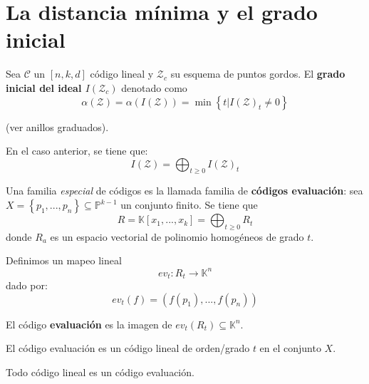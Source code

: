\documentclass[12pt]{report}
\newcounter{it}
\theoremstyle{largebreak}
\newcommand\cf[3]{\ensuremath{#1:#2\rightarrow#3}}
\begin{document}
    \section{La distancia mínima y el grado inicial}

    \begin{mydef}
        Sea $\mathcal{C}$ un $[n,k,d]$ código lineal y $\mathcal{Z}_c$ su esquema de puntos gordos. El \textbf{grado inicial del ideal $I(\mathcal{Z}_c)$} denotado como
        \begin{equation*}
            \alpha(\mathcal{Z})=\alpha(I(\mathcal{Z}))=\min\left\{t\Big|I(\mathcal{Z})_t\neq0 \right\}
        \end{equation*}
    \end{mydef}
    (ver anillos graduados).

    En el caso anterior, se tiene que:
    \begin{equation*}
        I(\mathcal{Z})=\bigoplus_{ t\geq0}I(\mathcal{Z})_t
    \end{equation*}

    Una familia \textit{especial} de códigos es la llamada familia de \textbf{códigos evaluación}: sea $X=\left\{p_1,...,p_n \right\}\subseteq\mathbb{P}^{ k-1}$ un conjunto finito. Se tiene que
    \begin{equation*}
        R=\mathbb{K}[x_1,...,x_k]=\bigoplus_{ t\geq0}R_t
    \end{equation*}
    donde $R_a$ es un espacio vectorial de polinomio homogéneos de grado $t$.

    Definimos un mapeo lineal
    \begin{equation*}
        \cf{ev_t}{R_t}{\mathbb{K}^n}
    \end{equation*}
    dado por:
    \begin{equation*}
        ev_t(f)=(f(p_1),...,f(p_n))
    \end{equation*}

    \begin{mydef}
        El código \textbf{evaluación} es la imagen de $ev_t(R_t)\subseteq\mathbb{K}^n$.
    \end{mydef}

    \begin{obs}
        El código evaluación es un código lineal de orden/grado $t$ en el conjunto $X$.
    \end{obs}

    \begin{theor}
        Todo código lineal es un código evaluación.
    \end{theor}
\end{document}
